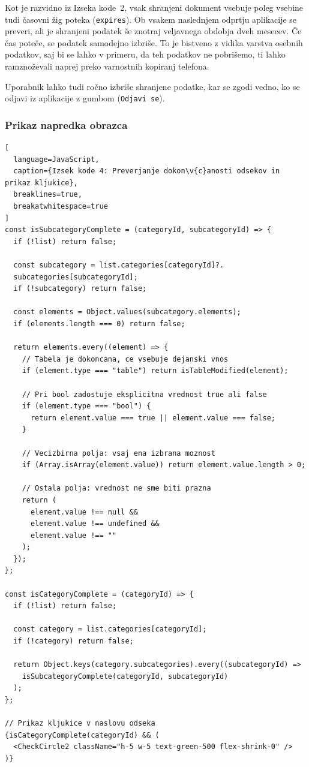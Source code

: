 \documentclass[12pt,a4paper]{article}
\begin{document}
Kot je razvidno iz Izseka kode~2, vsak shranjeni dokument vsebuje poleg vsebine tudi \v{c}asovni \v{z}ig poteka (\texttt{expires}). Ob vsakem naslednjem odprtju aplikacije se preveri, ali je shranjeni podatek \v{s}e znotraj veljavnega obdobja dveh mesecev. \v{C}e \v{c}as pote\v{c}e, se podatek samodejno izbri\v{s}e. To je bistveno z vidika varstva osebnih podatkov, saj bi se lahko v primeru, da teh podatkov ne pobrišemo, ti lahko ramznoževali naprej preko varnostnih kopiranj telefona.

Uporabnik lahko tudi ročno izbri\v{s}e shranjene podatke, kar se zgodi vedno, ko se odjavi iz aplikacije z gumbom (\texttt{Odjavi se}).

\subsubsection{Prikaz napredka obrazca}

\begin{lstlisting}[
  language=JavaScript,
  caption={Izsek kode 4: Preverjanje dokon\v{c}anosti odsekov in prikaz kljukice},
  breaklines=true,
  breakatwhitespace=true
]
const isSubcategoryComplete = (categoryId, subcategoryId) => {
  if (!list) return false;

  const subcategory = list.categories[categoryId]?.
  subcategories[subcategoryId];
  if (!subcategory) return false;

  const elements = Object.values(subcategory.elements);
  if (elements.length === 0) return false;

  return elements.every((element) => {
    // Tabela je dokoncana, ce vsebuje dejanski vnos
    if (element.type === "table") return isTableModified(element);

    // Pri bool zadostuje eksplicitna vrednost true ali false
    if (element.type === "bool") {
      return element.value === true || element.value === false;
    }

    // Vecizbirna polja: vsaj ena izbrana moznost
    if (Array.isArray(element.value)) return element.value.length > 0;

    // Ostala polja: vrednost ne sme biti prazna
    return (
      element.value !== null &&
      element.value !== undefined &&
      element.value !== ""
    );
  });
};

const isCategoryComplete = (categoryId) => {
  if (!list) return false;

  const category = list.categories[categoryId];
  if (!category) return false;

  return Object.keys(category.subcategories).every((subcategoryId) =>
    isSubcategoryComplete(categoryId, subcategoryId)
  );
};

// Prikaz kljukice v naslovu odseka
{isCategoryComplete(categoryId) && (
  <CheckCircle2 className="h-5 w-5 text-green-500 flex-shrink-0" />
)}
\end{lstlisting}
\end{document}
